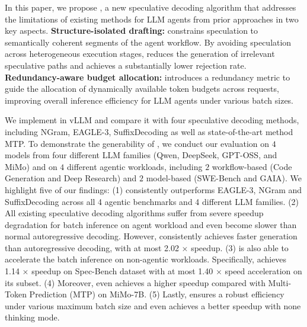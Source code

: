 In this paper, we propose \sysname, a new speculative decoding algorithm that addresses the limitations of existing methods for LLM agents from prior approaches in two key aspects.
 \textbf{Structure-isolated drafting:} \sysname constrains speculation to semantically coherent segments of the agent workflow. By avoiding speculation across heterogeneous execution stages, \sysname reduces the generation of irrelevant speculative paths and achieves a substantially lower rejection rate.
 \textbf{Redundancy-aware budget allocation:} \sysname introduces a redundancy metric to guide the allocation of dynamically available token budgets across requests, improving overall inference efficiency for LLM agents under various batch sizes.

We implement \sysname in vLLM and compare it with four speculative decoding methods, including NGram, EAGLE-3, SuffixDecoding as well as state-of-the-art method MTP. To demonstrate the generability of \sysname, we conduct our evaluation on $4$ models from four different LLM families (Qwen, DeepSeek, GPT-OSS, and MiMo) and on $4$ different agentic workloads, including $2$ workflow-based (Code Generation and Deep Research) and $2$ model-based (SWE-Bench and GAIA).
We highlight five of our findings:
%
(1) \sysname consistently outperforms EAGLE-3, NGram and SuffixDecoding across all 4 agentic benchmarks and 4 different LLM families. 
%
(2) All existing speculative decoding algorithms suffer from severe speedup degradation for batch inference on agent workload and even become slower than normal autoregressive decoding. However, \sysname consistently achieves faster generation than autoregressive decoding, with at most 2.02 $\times$ speedup.
%
(3) \sysname is also able to accelerate the batch inference on non-agentic workloads. Specifically, \sysname achieves 1.14 $\times$ speedup on Spec-Bench dataset with at most 1.40 $\times$ speed acceleration on its subset.
%
(4) Moreover, \sysname even achieves a higher speedup compared with Multi-Token Prediction (MTP) on MiMo-7B.
%
(5) Lastly, \sysname ensures a robust efficiency under various maximum batch size and even achieves a better speedup with none thinking mode.